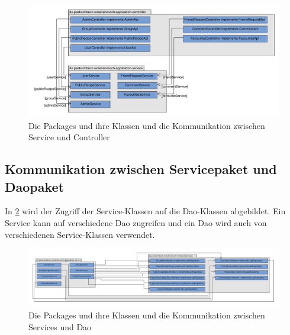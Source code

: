 \begin{figure}[H]
	\centering
	\includegraphics[width=\textwidth]{pics/KommunikationServerControllerService.pdf}%
	\caption{Die Packages und ihre Klassen und die Kommunikation zwischen Service und Controller}%
	\label{kommContrServ}
\end{figure}

\subsection{Kommunikation zwischen Servicepaket und Daopaket}

In \ref{kommServDao} wird der Zugriff der Service-Klassen auf die Dao-Klassen abgebildet. Ein Service kann auf verschiedene Dao zugreifen und ein Dao wird auch von verschiedenen Service-Klassen verwendet.

\begin{figure}[H]
	\centering
	\includegraphics[width=\textwidth]{pics/KommunikationServerServiceDao.pdf}%
	\caption{Die Packages und ihre Klassen und die Kommunikation zwischen Services und Dao}%
	\label{kommServDao}
\end{figure}


